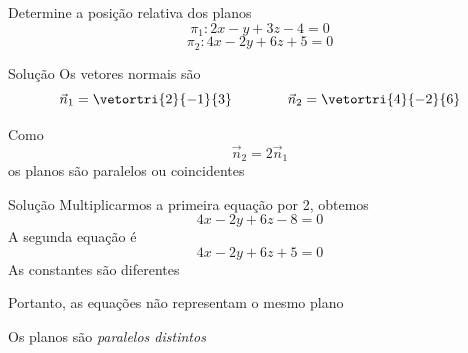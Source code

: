 \begin{question}
  Determine a posição relativa dos planos
  \[
    \pi_{1}\colon 2x - y + 3z - 4 = 0
  \]
  \[
    \pi_{2}\colon 4x - 2y + 6z + 5 = 0
  \]
\end{question}

\begin{resolution}{Solução}
  Os vetores normais são
  \[
    \vec{n}_{1} = \vetortri{2}{-1}{3}
    \qquad\qquad
    \vec{n}_{2} = \vetortri{4}{-2}{6}
  \]

  \pause
  Como
  \[
    \vec{n}_{2} = 2\vec{n}_{1}
  \]
  \pause
  os planos são paralelos ou coincidentes
\end{resolution}

\begin{resolution}{Solução}
  Multiplicarmos a primeira equação por 2,
  \pause
  obtemos
  \[
    4x-2y+6z-8=0
  \]
  \pause
  A segunda equação é
  \[
    4x-2y+6z+5=0
  \]
  \pause
  As constantes são diferentes

  \pause
  Portanto, as equações não representam o mesmo plano

  \pause
  Os planos são \emph{paralelos distintos}
\end{resolution}

\endinput
